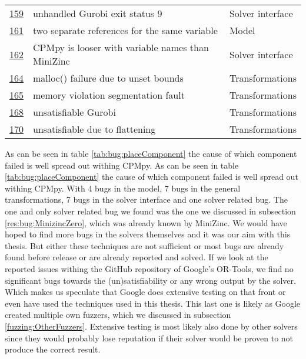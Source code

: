 \begin{table}[]
\begin{tabular}{lll}
		\href{https://github.com/CPMpy/cpmpy/issues/159}{159} & unhandled Gurobi exit status 9                    & Solver interface \\
		\href{https://github.com/CPMpy/cpmpy/issues/161}{161} & two separate references for the same variable     & Model            \\
		\href{https://github.com/CPMpy/cpmpy/issues/162}{162} & CPMpy is looser with variable names than MiniZinc & Solver interface \\
		\href{https://github.com/CPMpy/cpmpy/issues/164}{164} & malloc() failure due to unset bounds              & Transformations  \\
		\href{https://github.com/CPMpy/cpmpy/issues/165}{165} & memory violation segmentation fault               & Transformations  \\
		\href{https://github.com/CPMpy/cpmpy/issues/168}{168} & unsatisfiable Gurobi                              & Transformations  \\
		\href{https://github.com/CPMpy/cpmpy/issues/170}{170} & unsatisfiable due to flattening                   & Transformations  \\ \bottomrule        
	\end{tabular}
\end{table}

\label{res:PlaceOfBug}
As can be seen in table \ref{tab:bug:placeComponent} the cause of which component failed is well spread out withing CPMpy. 
As can be seen in table \ref{tab:bug:placeComponent} the cause of which component failed is well spread out withing CPMpy. 
With 4 bugs in the model, 7 bugs in the general transformations, 7 bugs in the solver interface and one solver related bug. The one and only solver related bug we found was the one we discussed in subsection \ref{res:bug:MinizincZero}, which was already known by MiniZinc. We would have hoped to find more bugs in the solvers themselves and it was our aim with this thesis. But either these techniques are not sufficient or most bugs are already found before release or are already reported and solved.
If we look at the reported issues withing the GitHub repository of Google's OR-Tools, we find no significant bugs towards the (un)satisfiability or any wrong output by the solver. Which makes us speculate that Google does extensive testing on that front or even have used the techniques used in this thesis. This last one is likely as Google created multiple own fuzzers, which we discussed in subsection  \ref{fuzzing:OtherFuzzers}. Extensive testing is most likely also done by other solvers since they would probably lose reputation if their solver would be proven to not produce the correct result.

